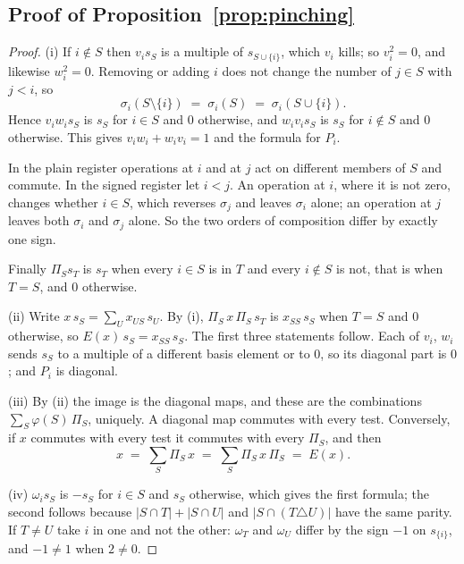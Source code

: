 \documentclass[11pt]{article}
\theoremstyle{plain}
\theoremstyle{definition}
\theoremstyle{plain}
\theoremstyle{definition}
\begin{document}
\subsection{\texorpdfstring{Proof of Proposition~\ref{prop:pinching}}{Proof of Proposition 8.2}}\label{prf:prop:pinching}

\begin{proof}
(i) If $i \notin S$ then $v_{i}s_{S}$ is a multiple of $s_{S \cup \{i\}}$, which $v_{i}$ kills; so $v_{i}^{2} = 0$, and likewise $w_{i}^{2} = 0$. Removing or adding $i$ does not change the number of $j \in S$ with $j < i$, so
\[
\sigma_{i}(S \setminus \{i\}) \;=\; \sigma_{i}(S) \;=\; \sigma_{i}(S \cup \{i\}) .
\]
Hence $v_{i}w_{i}s_{S}$ is $s_{S}$ for $i \in S$ and $0$ otherwise, and $w_{i}v_{i}s_{S}$ is $s_{S}$ for $i \notin S$ and $0$ otherwise. This gives $v_{i}w_{i} + w_{i}v_{i} = 1$ and the formula for $P_{i}$.

In the plain register operations at $i$ and at $j$ act on different members of $S$ and commute. In the signed register let $i < j$. An operation at $i$, where it is not zero, changes whether $i \in S$, which reverses $\sigma_{j}$ and leaves $\sigma_{i}$ alone; an operation at $j$ leaves both $\sigma_{i}$ and $\sigma_{j}$ alone. So the two orders of composition differ by exactly one sign.

Finally $\Pi_{S}s_{T}$ is $s_{T}$ when every $i \in S$ is in $T$ and every $i \notin S$ is not, that is when $T = S$, and $0$ otherwise.

(ii) Write $x\,s_{S} = \sum_{U} x_{US}\,s_{U}$. By (i), $\Pi_{S}\,x\,\Pi_{S}\,s_{T}$ is $x_{SS}\,s_{S}$ when $T = S$ and $0$ otherwise, so $E(x)\,s_{S} = x_{SS}\,s_{S}$. The first three statements follow. Each of $v_{i}$, $w_{i}$ sends $s_{S}$ to a multiple of a different basis element or to $0$, so its diagonal part is $0$; and $P_{i}$ is diagonal.

(iii) By (ii) the image is the diagonal maps, and these are the combinations $\sum_{S}\varphi(S)\,\Pi_{S}$, uniquely. A diagonal map commutes with every test. Conversely, if $x$ commutes with every test it commutes with every $\Pi_{S}$, and then
\[
x \;=\; \sum_{S}\Pi_{S}\,x \;=\; \sum_{S}\Pi_{S}\,x\,\Pi_{S} \;=\; E(x) .
\]

(iv) $\omega_{i}s_{S}$ is $-s_{S}$ for $i \in S$ and $s_{S}$ otherwise, which gives the first formula; the second follows because $|S \cap T| + |S \cap U|$ and $|S \cap (T \triangle U)|$ have the same parity. If $T \neq U$ take $i$ in one and not the other: $\omega_{T}$ and $\omega_{U}$ differ by the sign $-1$ on $s_{\{i\}}$, and $-1 \neq 1$ when $2 \neq 0$.


\end{proof}
\end{document}
